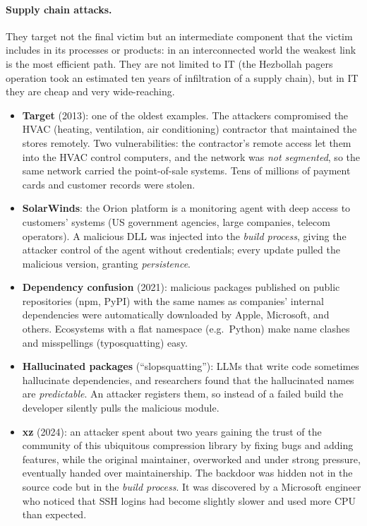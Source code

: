 \paragraph{Supply chain attacks.} They target not the final victim but an intermediate component that the victim includes in its processes or products: in an interconnected world the weakest link is the most efficient path. They are not limited to IT (the Hezbollah pagers operation took an estimated ten years of infiltration of a supply chain), but in IT they are cheap and very wide-reaching.
\begin{itemize}
    \item \textbf{Target} (2013): one of the oldest examples. The attackers compromised the HVAC (heating, ventilation, air conditioning) contractor that maintained the stores remotely. Two vulnerabilities: the contractor's remote access let them into the HVAC control computers, and the network was \emph{not segmented}, so the same network carried the point-of-sale systems. Tens of millions of payment cards and customer records were stolen.
    \item \textbf{SolarWinds}: the Orion platform is a monitoring agent with deep access to customers' systems (US government agencies, large companies, telecom operators). A malicious DLL was injected into the \emph{build process}, giving the attacker control of the agent without credentials; every update pulled the malicious version, granting \emph{persistence}.
    \item \textbf{Dependency confusion} (2021): malicious packages published on public repositories (npm, PyPI) with the same names as companies' internal dependencies were automatically downloaded by Apple, Microsoft, and others. Ecosystems with a flat namespace (e.g.\ Python) make name clashes and misspellings (typosquatting) easy.
    \item \textbf{Hallucinated packages} (\enquote{slopsquatting}): LLMs that write code sometimes hallucinate dependencies, and researchers found that the hallucinated names are \emph{predictable}. An attacker registers them, so instead of a failed build the developer silently pulls the malicious module.
    \item \textbf{xz} (2024): an attacker spent about two years gaining the trust of the community of this ubiquitous compression library by fixing bugs and adding features, while the original maintainer, overworked and under strong pressure, eventually handed over maintainership. The backdoor was hidden not in the source code but in the \emph{build process}. It was discovered by a Microsoft engineer who noticed that SSH logins had become slightly slower and used more CPU than expected.
\end{itemize}

